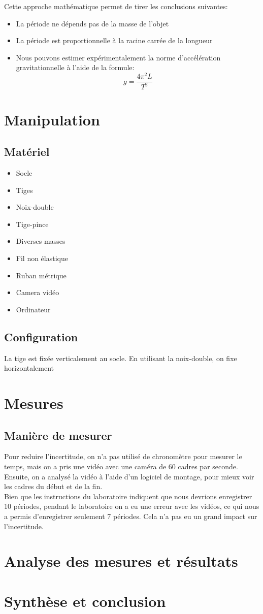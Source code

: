 \documentclass[12pt,a4paper]{article}
\begin{document}
    Cette approche mathématique permet de tirer les conclusions suivantes:
    \begin{itemize}
        \item La période ne dépends pas de la masse de l'objet
        \item La période est proportionnelle à la racine carrée de la longueur
        \item Nous pouvons estimer expérimentalement la norme d'accélération gravitationnelle à l'aide de la formule: 
        \begin{equation*}
            g=\frac{4\pi^2L}{T^2}
        \end{equation*}
    \end{itemize}

    \section{Manipulation}
    \subsection{Matériel}
    \begin{itemize}
        \item Socle
        \item Tiges
        \item Noix-double
        \item Tige-pince
        \item Diverses masses
        \item Fil non élastique
        \item Ruban métrique
        \item Camera vidéo
        \item Ordinateur
    \end{itemize}
    \subsection{Configuration}
    La tige est fixée verticalement au socle. En utilisant la noix-double, on fixe horizontalement

    \section{Mesures}
    \subsection{Manière de mesurer}
    Pour reduire l'incertitude, on n'a pas utilisé de chronomètre pour mesurer le temps, mais on a pris une vidéo avec une caméra de 60 cadres par seconde. Ensuite, on a analysé la vidéo à l'aide d'un logiciel de montage, pour mieux voir les cadres du début et de la fin. \\
    Bien que les instructions du laboratoire indiquent que nous devrions enregistrer 10 périodes, pendant le laboratoire on a eu une erreur avec les vidéos, ce qui nous a permis d'enregistrer seulement 7 périodes. Cela n'a pas eu un grand impact sur l'incertitude.

    \section{Analyse des mesures et résultats}

    \section{Synthèse et conclusion}
\end{document}

